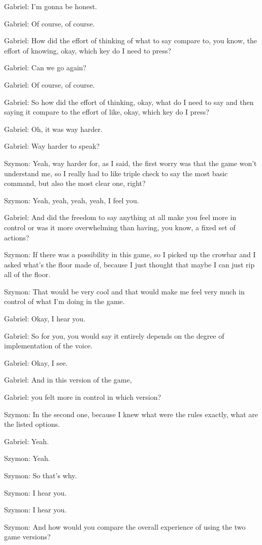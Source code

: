 Gabriel: I'm gonna be honest.

Gabriel: Of course, of course.

Gabriel: How did the effort of thinking of what to say compare to, you know, the effort of knowing, okay, which key do I need to press?

Gabriel: Can we go again?

Gabriel: Of course, of course.

Gabriel: So how did the effort of thinking, okay, what do I need to say and then saying it compare to the effort of like, okay, which key do I press?

Gabriel: Oh, it was way harder.

Gabriel: Way harder to speak?

Szymon: Yeah, way harder for, as I said, the first worry was that the game won't understand me, so I really had to like triple check to say the most basic command, but also the most clear one, right?

Szymon: Yeah, yeah, yeah, yeah, I feel you.

Gabriel: And did the freedom to say anything at all make you feel more in control or was it more overwhelming than having, you know, a fixed set of actions?

Szymon: If there was a possibility in this game, so I picked up the crowbar and I asked what's the floor made of, because I just thought that maybe I can just rip all of the floor.

Szymon: That would be very cool and that would make me feel very much in control of what I'm doing in the game.

Gabriel: Okay, I hear you.

Gabriel: So for you, you would say it entirely depends on the degree of implementation of the voice.

Gabriel: Okay, I see.

Gabriel: And in this version of the game,

Gabriel: you felt more in control in which version?

Szymon: In the second one, because I knew what were the rules exactly, what are the listed options.

Gabriel: Yeah.

Szymon: Yeah.

Szymon: So that's why.

Szymon: I hear you.

Szymon: I hear you.

Szymon: And how would you compare the overall experience of using the two game versions?

